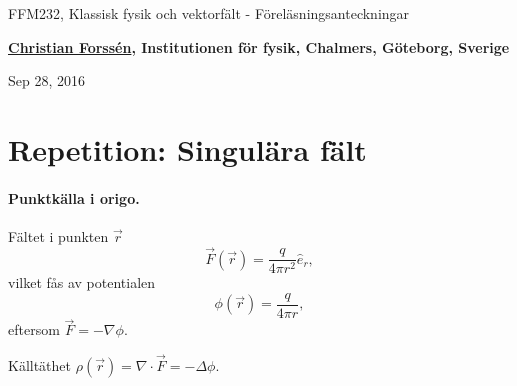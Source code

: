 \documentclass[%
oneside,                 %
final,                   %
10pt]{article}
\begin{document}






\thispagestyle{empty}

\begin{center}
{\LARGE\bf
\begin{spacing}{1.25}
FFM232, Klassisk fysik och vektorfält - Föreläsningsanteckningar
\end{spacing}
}
\end{center}


\begin{center}
{\bf \href{{http://fy.chalmers.se/subatom/tsp/}}{Christian Forssén}, Institutionen för fysik, Chalmers, Göteborg, Sverige${}^{}$} \\ [0mm]
\end{center}

\begin{center}
\end{center}
    

\begin{center}
Sep 28, 2016
\end{center}

\vspace{1cm}


\section{Repetition: Singulära fält}

\paragraph{Punktkälla i origo.}
Fältet i punkten $\vec{r}$
\begin{equation}
  \vec{F}(\vec{r}) = \frac{q}{4 \pi r^2} \hat{e}_r,
\end{equation}
vilket fås av potentialen
\begin{equation}
  \phi(\vec{r}) = \frac{q}{4 \pi r},
\end{equation}
eftersom $\vec{F} = - \nabla \phi$.

Källtäthet $\rho (\vec{r}) = \nabla \cdot \vec{F} = - \Delta \phi$.
\end{document}
